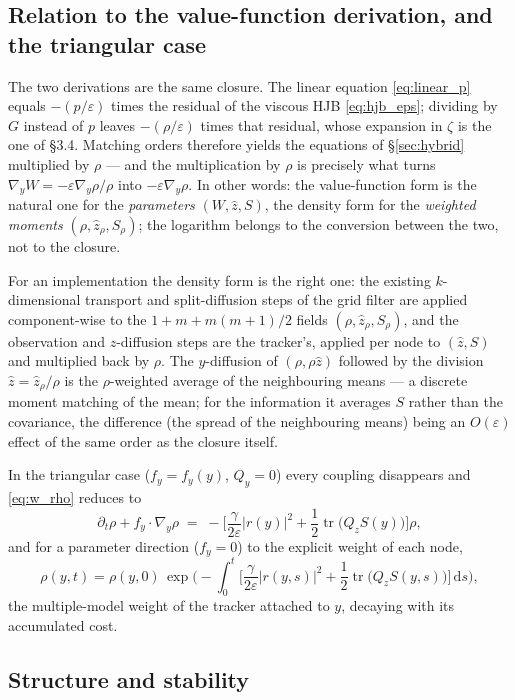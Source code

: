 \documentclass[11pt,a4paper]{article}
\newcommand{\dd}{\,\mathrm{d}}
\newcommand{\tr}{\operatorname{tr}}
\newcommand{\zh}{\hat{z}}
\newcommand{\zr}{\hat{z}_{\rho}}   %
\newcommand{\Sr}{S_{\rho}}          %
\newcommand{\eps}{\varepsilon}
\newcommand{\abs}[1]{\left\lvert #1 \right\rvert}
\newcommand{\gy}{\nabla_{\!y}}
\theoremstyle{plain}
\theoremstyle{definition}
\theoremstyle{remark}
\begin{document}
\subsection{Relation to the value-function derivation, and the triangular case}

The two derivations are the same closure. The linear equation \eqref{eq:linear_p} equals $-(p/\eps)$ times the residual of the viscous HJB \eqref{eq:hjb_eps}; dividing by $G$ instead of $p$ leaves $-(\rho/\eps)$ times that residual, whose expansion in $\zeta$ is the one of \S3.4. Matching orders therefore yields the equations of \S\ref{sec:hybrid} multiplied by $\rho$ --- and the multiplication by $\rho$ is precisely what turns $\gy W = -\eps\gy\rho/\rho$ into $-\eps\gy\rho$. In other words: the value-function form is the natural one for the \emph{parameters} $(W,\zh,S)$, the density form for the \emph{weighted moments} $(\rho,\zr,\Sr)$; the logarithm belongs to the conversion between the two, not to the closure.

For an implementation the density form is the right one: the existing $k$-dimensional transport and split-diffusion steps of the grid filter are applied component-wise to the $1+m+m(m+1)/2$ fields $(\rho,\zr,\Sr)$, and the observation and $z$-diffusion steps are the tracker's, applied per node to $(\zh,S)$ and multiplied back by $\rho$. The $y$-diffusion of $(\rho,\rho\zh)$ followed by the division $\zh=\zr/\rho$ is the $\rho$-weighted average of the neighbouring means --- a discrete moment matching of the mean; for the information it averages $S$ rather than the covariance, the difference (the spread of the neighbouring means) being an $O(\eps)$ effect of the same order as the closure itself.

In the triangular case ($f_y=f_y(y)$, $Q_y=0$) every coupling disappears and \eqref{eq:w_rho} reduces to
\[
  \partial_t\rho + f_y\cdot\gy\rho \;=\; -\Big[\frac{\gamma}{2\eps}\abs{r(y)}^2 + \frac12\tr\big(Q_zS(y)\big)\Big]\rho ,
\]
and for a parameter direction ($f_y=0$) to the explicit weight of each node,
\[
  \rho(y,t) = \rho(y,0)\,\exp\Big(-\int_0^t\Big[\frac{\gamma}{2\eps}\abs{r(y,s)}^2 + \frac12\tr\big(Q_zS(y,s)\big)\Big]\dd s\Big),
\]
the multiple-model weight of the tracker attached to $y$, decaying with its accumulated cost.

\subsection{Structure and stability}
\label{sec:stability}
\end{document}
